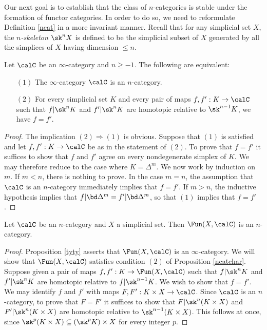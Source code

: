 Our next goal is to establish that the class of $n$-categories is stable under the formation of functor categories.
In order to do so, we need to reformulate Definition \ref{ncat} in a more invariant manner.
Recall that for any simplicial set $X$, the {\it $n$-skeleton} $\sk^n X$ is defined to be the simplicial subset of $X$ generated by all the simplices of $X$ having dimension $\leq n$.

\begin{proposition}\label{ncatchar}
Let $\calC$ be an $\infty$-category and $n \geq -1$. The following are equivalent:
\begin{itemize}
\item[$(1)$] The $\infty$-category $\calC$ is an $n$-category.
\item[$(2)$] For every simplicial set $K$ and
every pair of maps $f,f': K \rightarrow \calC$ such that
$f | \sk^{n} K$ and $f'|\sk^{n} K$ are homotopic relative to
$\sk^{n-1} K$, we have $f = f'$.
\end{itemize}
\end{proposition}

\begin{proof}
The implication $(2) \Rightarrow (1)$ is obvious. Suppose that $(1)$ is satisfied and let
$f,f': K \rightarrow \calC$ be as in the statement of $(2)$. To prove that
$f = f'$ it suffices to show that $f$ and $f'$ agree on
every nondegenerate simplex of $K$. We may therefore reduce to the case where
$K = \Delta^m$. We now work by induction on $m$. If $m < n$, there is nothing to prove.
In the case $m=n$, the assumption that $\calC$ is an $n$-category immediately implies that $f=f'$. If $m > n$, the inductive hypothesis implies that $f| \bd \Delta^m = f'| \bd \Delta^m$, so that
$(1)$ implies that $f = f'$.
\end{proof}

\begin{corollary}\label{zooka}
Let $\calC$ be an $n$-category and $X$ a simplicial set. Then $\Fun(X,\calC)$ is an $n$-category.
\end{corollary}

\begin{proof}
Proposition \ref{tyty} asserts that $\Fun(X,\calC)$ is an $\infty$-category. 
We will show that $\Fun(X,\calC)$ satisfies condition $(2)$ of Proposition \ref{ncatchar}.
Suppose given a pair of maps $f,f': K \rightarrow \Fun(X,\calC)$ such that
$f| \sk^{n} K$ and $f'| \sk^{n} K$ are homotopic relative to $f| \sk^{n-1} K$. We wish to show
that $f = f'$. We may identify $f$ and $f'$ with maps $F,F': K \times X \rightarrow \calC$.
Since $\calC$ is an $n$-category, to prove that $F = F'$ it suffices to show that
$F | \sk^{n}(K \times X)$ and $F' | \sk^{n}(K \times X)$ are homotopic relative to
$\sk^{n-1}(K \times X)$. This follows at once, since
$\sk^{p}(K \times X) \subseteq (\sk^{p} K) \times X$ for every integer $p$.
\end{proof}

